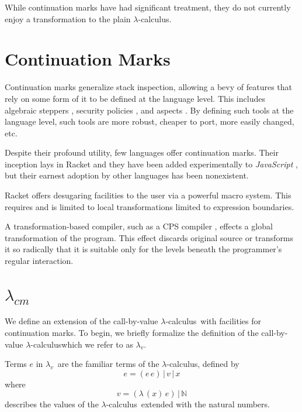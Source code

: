 \documentclass{llncs}
\newcommand{\cm}[0]{$\lambda_{cm}$}
\newcommand{\lv}[0]{$\lambda_v$}
\newcommand{\lc}[0]{$\lambda$-calculus}
\newcommand{\app}[2]{(#1\,#2)}
\newcommand{\abs}[2]{(\lambda\,(#1)\,#2)}
\begin{document}
While continuation marks have had significant treatment, they do not currently enjoy a transformation to the plain $\lambda$-calculus.

\section{Continuation Marks}

Continuation marks generalize stack inspection, allowing a bevy of features that rely on some form of it to be defined at the language level. This includes algebraic steppers \cite{clements2001modeling}, security policies \cite{clements2004tail}, and aspects \cite{tucker2003pointcuts}. By defining such tools at the language level, such tools are more robust, cheaper to port, more easily changed, etc.

Despite their profound utility, few languages offer continuation marks. Their inception lays in Racket \cite{plt-tr1} and they have been added experimentally to \emph{JavaScript} \cite{clements2008implementing}, but their earnest adoption by other languages has been nonexistent.



Racket offers desugaring facilities to the user via a powerful macro system. This requires and is limited to local transformations limited to expression boundaries.

A transformation-based compiler, such as a CPS compiler \cite{appel2007compiling}, effects a global transformation of the program. This effect discards original source or transforms it so radically that it is suitable only for the levels beneath the programmer's regular interaction.

\section{\cm}

We define an extension of the call-by-value \lc\ with facilities for continuation marks. To begin, we briefly formalize the definition of the call-by-value \lc which we refer to as \lv.

Terms $e$ in \lv\ are the familiar terms of the \lc, defined by
\begin{equation}
e=\app{e}{e}\,|\,v\,|\,x
\end{equation}
where 
\begin{equation}
v=\abs{x}{e}\,|\,\mathbb{N}
\end{equation}
describes the values of the \lc\ extended with the natural numbers.
\end{document}
